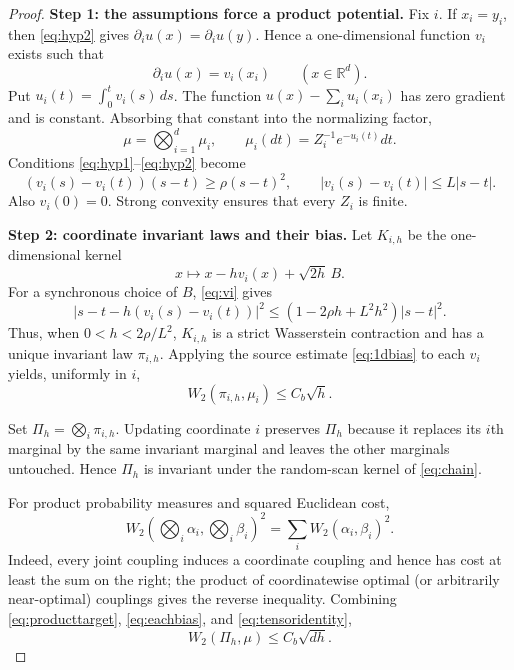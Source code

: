 \documentclass[11pt]{article}
\newcommand{\R}{\mathbb R}
\newcommand{\W}{W_2}
\begin{document}
\begin{proof}
\textbf{Step 1: the assumptions force a product potential.}
Fix $i$. If $x_i=y_i$, then \eqref{eq:hyp2} gives
$\partial_i u(x)=\partial_i u(y)$. Hence a one-dimensional function $v_i$
exists such that
\[
 \partial_i u(x)=v_i(x_i)\qquad(x\in\R^d).
\]
Put $u_i(t)=\int_0^t v_i(s)\,ds$. The function
$u(x)-\sum_i u_i(x_i)$ has zero gradient and is constant. Absorbing that
constant into the normalizing factor,
\begin{equation}\label{eq:producttarget}
 \mu=\bigotimes_{i=1}^d\mu_i,
 \qquad
 \mu_i(dt)=Z_i^{-1}e^{-u_i(t)}dt.
\end{equation}
Conditions \eqref{eq:hyp1}--\eqref{eq:hyp2} become
\begin{equation}\label{eq:vi}
 (v_i(s)-v_i(t))(s-t)\geq\rho(s-t)^2,
 \qquad |v_i(s)-v_i(t)|\leq L|s-t|.
\end{equation}
Also $v_i(0)=0$. Strong convexity ensures that every $Z_i$ is finite.

\textbf{Step 2: coordinate invariant laws and their bias.}
Let $K_{i,h}$ be the one-dimensional kernel
\[
 x\longmapsto x-hv_i(x)+\sqrt{2h}\,B.
\]
For a synchronous choice of $B$, \eqref{eq:vi} gives
\begin{equation}\label{eq:coordinatecontraction}
 |s-t-h(v_i(s)-v_i(t))|^2
 \leq(1-2\rho h+L^2h^2)|s-t|^2.
\end{equation}
Thus, when $0<h<2\rho/L^2$, $K_{i,h}$ is a strict Wasserstein contraction
and has a unique invariant law $\pi_{i,h}$. Applying the source estimate
\eqref{eq:1dbias} to each $v_i$ yields, uniformly in $i$,
\begin{equation}\label{eq:eachbias}
 \W(\pi_{i,h},\mu_i)\leq C_b\sqrt h.
\end{equation}

Set $\Pi_h=\bigotimes_i\pi_{i,h}$. Updating coordinate $i$ preserves
$\Pi_h$ because it replaces its $i$th marginal by the same invariant marginal
and leaves the other marginals untouched. Hence $\Pi_h$ is invariant under
the random-scan kernel of \eqref{eq:chain}.

For product probability measures and squared Euclidean cost,
\begin{equation}\label{eq:tensoridentity}
 \W\!\left(\bigotimes_i\alpha_i,\bigotimes_i\beta_i\right)^2
 =\sum_i\W(\alpha_i,\beta_i)^2.
\end{equation}
Indeed, every joint coupling induces a coordinate coupling and hence has cost
at least the sum on the right; the product of coordinatewise optimal (or
arbitrarily near-optimal) couplings gives the reverse inequality. Combining
\eqref{eq:producttarget}, \eqref{eq:eachbias}, and
\eqref{eq:tensoridentity},
\begin{equation}\label{eq:productbias}
 \W(\Pi_h,\mu)\leq C_b\sqrt{dh}.
\end{equation}


\end{proof}
\end{document}

